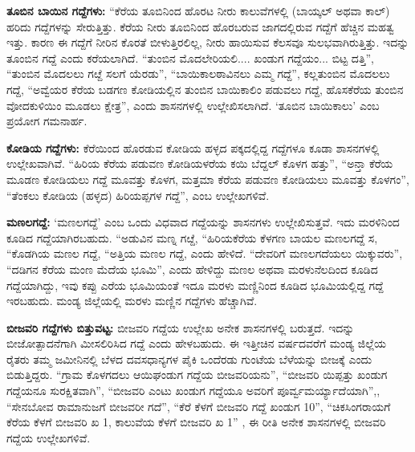 \vskip 2pt

\textbf{ತೂಬಿನ ಬಾಯಿನ ಗದ್ದೆಗಳು:} “ಕೆರೆಯ ತೂಬಿನಿಂದ ಹೊರಟ ನೀರು ಕಾಲುವೆಗಳಲ್ಲಿ (ಬಾಯ್ಕಲ್​ ಅಥವಾ ಕಾಲ್​) ಹರಿದು ಗದ್ದೆಗಳನ್ನು ಸೇರುತ್ತಿತ್ತು. ಕೆರೆಯ ನೀರು ತೂಬಿನಿಂದ ಹೊರಬರುವ ಜಾಗದಲ್ಲಿರುವ ಗದ್ದೆಗೆ ಹೆಚ್ಚಿನ ಮಹತ್ವ ಇತ್ತು. ಕಾರಣ ಈ ಗದ್ದೆಗೆ ನೀರಿನ ಕೊರತೆ ಬೀಳುತ್ತಿರಲಿಲ್ಲ, ನೀರು ಹಾಯಿಸುವ ಕೆಲಸವೂ ಸುಲಭವಾಗಿರುತ್ತಿತ್ತು. ಇದನ್ನು ತೂಂಬಿನ ಗದ್ದೆ ಎಂದು ಕರೆಯಲಾಗಿದೆ. “ತುಂಬಿನ ಮೊದಲೇರಿಯಲಿ.... ಖಂಡುಗ ಗದ್ದೆಯಂ... ಬಿಟ್ಟ ದತ್ತಿ”, “ತುಂಬಿನ ಮೊದಲಲು ಗೞ್ದೆ ಸಲಗೆ ಯೆರಡು”, “ಬಾಯಿಕಾಲಠಾವಿನಲು ಎಮ್ಮ ಗದ್ದೆ”, ಕಲ್ಲತುಂಬಿನ ಮೊದಲಲು ಗದ್ದೆ, “ಅವ್ವೆಯರ ಕೆರೆಯ ಬಡಗಣ ಕೋಡಿಯಲ್ಲಿನ ತುಂಬಿನ ಬಾಯಿಕಾಲಿಂ ಪಡುವಲು ಗದ್ದೆ, ಹೊಸಕೆರೆಯ ತುಂಬಿನ ವೋದಕುಳಿಯಿಂ ಮೂಡಲು ಕ್ಷೇತ್ರ”, ಎಂದು ಶಾಸನಗಳಲ್ಲಿ ಉಲ್ಲೇಖಿಸಲಾಗಿದೆ. ‘ತೂಬಿನ ಬಾಯಿಕಾಲು’ ಎಂಬ ಪ್ರಯೋಗ ಗಮನಾರ್ಹ.

\vskip 2pt

\textbf{ಕೋಡಿಯ ಗದ್ದೆಗಳು:} ಕೆರೆಯಿಂದ ಹೊರಡುವ ಕೋಡಿಯ ಹಳ್ಳದ ಪಕ್ಕದಲ್ಲಿದ್ದ ಗದ್ದೆಗಳೂ ಕೂಡಾ ಶಾಸನಗಳಲ್ಲಿ ಉಲ್ಲೇಖವಾಗಿವೆ. “ಹಿರಿಯ ಕೆರೆಯ ಪಡುವಣ ಕೋಡಿಯಳರೆಯ ಕಯಿ ಬೆದ್ದಲ್​ ಕೊಳಗ ಹತ್ತು”, “ಅನ್ತಾ ಕೆರೆಯ ಮೂಡಣ ಕೋಡಿಯಲು ಗದ್ದೆ ಮೂವತ್ತು ಕೊಳಗ, ಮತ್ತಮಾ ಕೆರೆಯ ಪಡುವಣ ಕೋಡಿಯಲು ಮೂವತ್ತು ಕೊಳಗಂ”, “ತೆಂಕಲು ಕೋಡಿಯ (ಹಳ್ಳದ) ಹಿರಿಯಪ್ಪಗಳ ಗದ್ದೆ”, ಎಂಬ ಉಲ್ಲೇಖಗಳಿವೆ.

\textbf{ಮಣಲಗದ್ದೆ:} ‘ಮಣಲಗದ್ದೆ’ ಎಂಬ ಒಂದು ವಿಧವಾದ ಗದ್ದೆಯನ್ನು ಶಾಸನಗಳು ಉಲ್ಲೇಖಿಸುತ್ತವೆ. ಇದು ಮರಳಿನಿಂದ ಕೂಡಿದ ಗದ್ದೆಯಾಗಿರಬಹುದು. “ಅಡುವಿನ ಮಣ್ನ ಗೞ್ದೆ, “ಹಿರಿಯಕೆರೆಯ ಕೆಳಗಣ ಬಾಯಲ ಮಣಲಗದ್ದೆ ಸ, “ಕೊಡಗಿಯ ಮಣಲ ಗದ್ದೆ, “ಅತ್ತಿಯ ಮಣಲ ಗದ್ದೆ, ಎಂದು ಹೇಳಿದೆ. “ದೇವರಿಗೆ ಮಣಲಗದೆಯಲು ಯಿಕ್ಕುವರು”, “ದಡಿಗನ ಕೆರೆಯ ಮಂಣ ಮೆದೆಯ ಭೂಮಿ”, ಎಂದು ಹೇಳಿದ್ದು ಮಣಲ ಅಥವಾ ಮರಳುನೆಲದಿಂದ ಕೂಡಿದ ಗದ್ದೆಯಾಗಿದ್ದು, ಇವು ಕಪ್ಪು ಎರೆಯ ಭೂಮಿಯಂತೆ ಇದೂ ಮರಳು ಮಣ್ಣಿನಿಂದ ಕೂಡಿದ ಭೂಮಿಯಲ್ಲಿದ್ದ ಗದ್ದೆ ಇರಬಹುದು. ಮಂಡ್ಯ ಜಿಲ್ಲೆಯಲ್ಲಿ ಮರಳು ಮಣ್ಣಿನ ಗದ್ದೆಗಳು ಹೆಚ್ಚಾಗಿವೆ.

\textbf{ಬೀಜವರಿ ಗದ್ದೆಗಳು \general{\enginline{-}} ಬಿತ್ತುವಟ್ಟ:} ಬೀಜವರಿ ಗದ್ದೆಯ ಉಲ್ಲೇಖ ಅನೇಕ ಶಾಸನಗಳಲ್ಲಿ ಬರುತ್ತದೆ. ಇದನ್ನು ಬೀಜೋತ್ಪಾದನೆಗಾಗಿ ಮೀಸಲಿರಿಸಿದ ಗದ್ದೆ ಎಂದು ಹೇಳಬಹುದು. ಈ ಇತ್ತೀಚಿನ ವರ್ಷದವರೆಗೆ ಮಂಡ್ಯ ಜಿಲ್ಲೆಯ ರೈತರು ತಮ್ಮ ಜಮೀನಿನಲ್ಲಿ ಬೆಳದ ದವಸಧಾನ್ಯಗಳ ಪೈಕಿ ಒಂದೆರಡು ಗುಂಟೆಯ ಬೆಳೆಯನ್ನು ಬೀಜಕ್ಕೆ ಎಂದು ಬಿಡುತ್ತಿದ್ದರು. “ಗ್ರಾಮ ಕೊಳಗದಲು ಆಯಿಘಂಡುಗ ಗದ್ದೆಯ ಬೀಜವರಿಯನು”, “ಬೀಜವರಿ ಯಿಪ್ಪತ್ತು ಖಂಡುಗ ಗದ್ದೆಯನೂ ಸುರಕ್ಷಿತವಾಗಿ”, “ಬೀಜವರಿ ಎಂಟು ಖಂಡುಗ ಗದ್ದೆಯೂ ಅವರಿಗೆ ಪೂರ್ವ್ವಮರ್ಯ್ಯಾದೆಯಾಗಿ”,, “ಸೇನಬೋವ ರಾಮಾನುಜಗೆ ಬೀಜವರೀ ಗದೆ”, “ಕೆರೆ ಕೆಳಗೆ ಬೀಜವರಿ ಗದ್ದೆ ಖಂಡುಗ 10”, “ಚಿಕಸಿಂಗರಾಯಗೆ ಕೆರೆಯ ಕೆಳಗೆ ಬೀಜವರಿ ಖ 1, ಕಾಲುವೆಯ ಕೆಳಗೆ ಬೀಜವರಿ ಖ 1” , ಈ ರೀತಿ ಅನೇಕ ಶಾಸನಗಳಲ್ಲಿ ಬೀಜವರಿ ಗದ್ದೆಯ ಉಲ್ಲೇಖಗಳಿವೆ.

